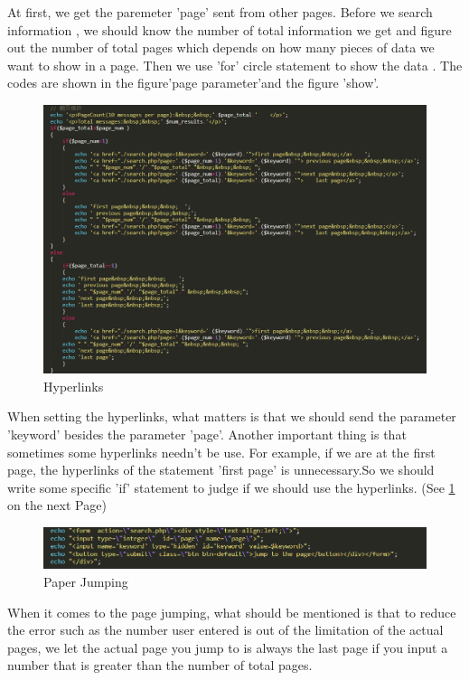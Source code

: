 \documentclass{book}
\begin{document}
At first, we get the paremeter 'page' sent from other pages. Before we search information , we should know the number of total information we get and figure out the number of total pages which depends on how many pieces of data we want to show in a page. Then we use 'for' circle statement to show the data . The codes are shown in the figure'page parameter'and the figure 'show'.



\begin{figure}[ht]
\centering
\includegraphics[scale=0.3]{img/dsw_chao.png}
\caption{Hyperlinks}
\label{fig:dsw2}
\end{figure}

When setting the hyperlinks, what matters is that we should send the parameter 'keyword' besides the parameter 'page'. Another important thing is that sometimes some hyperlinks needn't be use. For example, if we are at the first page, the hyperlinks of the statement 'first page' is unnecessary.So we should write some specific 'if' statement to judge if we should use the hyperlinks.
(See \ref{fig:dsw2} on the next Page)

\begin{figure}[H]
\centering
\includegraphics[scale=0.35]{img/dsw_input.png}
\caption{Paper Jumping}
\end{figure}

When it comes to the page jumping, what should be mentioned is that to reduce the error such as the number user entered is out of the limitation of the actual pages, we let the actual page you jump to is always the last page if you input a number that is greater than the number of total pages.
\end{document}
